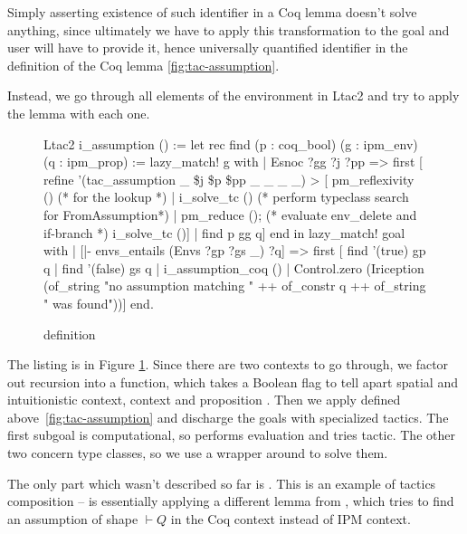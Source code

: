Simply asserting existence of such identifier in a Coq lemma doesn't solve anything, since ultimately we have to apply this transformation to the goal and user will have to provide it, hence universally quantified identifier in the definition of the Coq lemma \ref{fig:tac-assumption}.

Instead, we go through all elements of the environment in Ltac2 and try to apply the lemma with each one.

\begin{figure}
\begin{coq}
Ltac2 i_assumption () :=
  let rec find (p : coq_bool) (g : ipm_env) (q : ipm_prop) :=
      lazy_match! g with
      | Esnoc ?gg ?j ?pp =>
        first [ refine '(tac_assumption _ \$j \$p \$pp _ _ _ _) >
                [ pm_reflexivity () (* for the lookup *)
                | i_solve_tc () (* perform typeclass search for FromAssumption*)
                | pm_reduce (); (* evaluate env_delete and if-branch *)
                  i_solve_tc ()]
              | find p gg q]
      end
  in
  lazy_match! goal with
  | [|- envs_entails (Envs ?gp ?gs _) ?q] =>
     first [ find '(true) gp q
           | find '(false) gs q
           | i_assumption_coq ()
           | Control.zero (Iriception (of_string "no assumption matching " ++
                                       of_constr q ++
                                       of_string " was found"))]
  end.
\end{coq}  
\caption{ definition}
\label{fig:i-assumption-def}
\end{figure}

The listing is in Figure \ref{fig:i-assumption-def}.
Since there are two contexts to go through, we factor out recursion into a  function, which takes a Boolean flag  to tell apart spatial and intuitionistic context, context  and proposition .
Then we apply  defined above~\ref{fig:tac-assumption} and discharge the goals with specialized tactics.
The first subgoal  is computational, so  performs evaluation and tries  tactic.
The other two concern type classes, so we use a wrapper around  to solve them.

The only part which wasn't described so far is .
This is an example of tactics composition --  is essentially applying a different lemma from , which tries to find an assumption of shape \(\vdash Q\) in the Coq context instead of IPM context.

